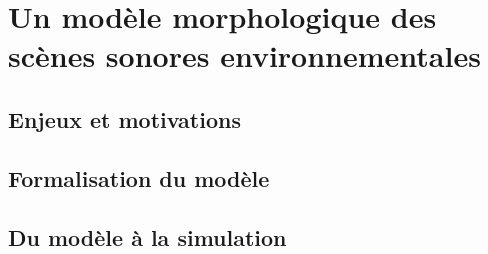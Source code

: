 \chapter{Un modèle morphologique des scènes sonores environnementales}\label{ch:psycho_model} %

\section{Enjeux et motivations}

\section{Formalisation du modèle}

\section{Du modèle à la simulation}

